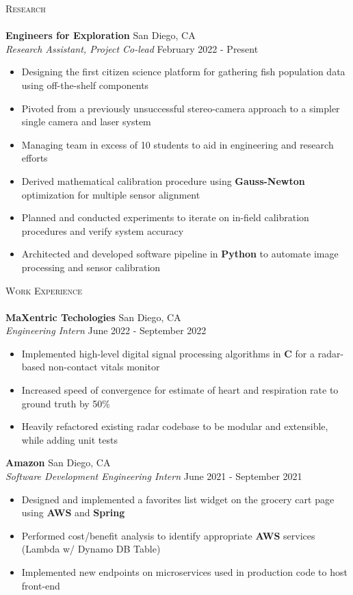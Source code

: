 \documentclass[a4paper]{article}
\newcommand{\lineunder} {
    \vspace*{-8pt} \\
    \hspace*{-18pt} \hrulefill \\
}
\newcommand{\header} [1] {
    {\hspace*{-18pt}\vspace*{6pt} \textsc{#1}}
    \vspace*{-6pt} \lineunder
}
\newenvironment{entry}[4][]{
  \textbf{#2} \hfill #1 \\
  \textit{#3} \hfill #4 \\
  \vspace{-2mm}
  \begin{itemize} \itemsep 0em
  }
  {
  \end{itemize}
}
\begin{document}
\header{Research}
\vspace{1mm}
\begin{entry}[San Diego, CA]{Engineers for Exploration}{Research
    Assistant, Project Co-lead}{February 2022 - Present}
	\item Designing the first citizen science platform for gathering fish population data
    using off-the-shelf components
    \item Pivoted from a previously unsuccessful stereo-camera approach to a simpler single camera and laser system
    \item Managing team in excess of 10 students to aid in engineering and research efforts
  \item Derived mathematical calibration procedure using \textbf{Gauss-Newton} optimization
    for multiple sensor alignment
  \item Planned and conducted experiments to iterate on in-field calibration procedures and verify system accuracy
	\item Architected and developed software pipeline in \textbf{Python} to automate image
    processing and sensor calibration
\end{entry}


\header{Work Experience}
\vspace{1mm}
\begin{entry}[San Diego, CA]{MaXentric Techologies}{Engineering Intern}{June
    2022 - September 2022}
	\item Implemented high-level digital signal processing algorithms in \textbf{C} for a radar-based non-contact vitals monitor
  \item Increased speed of convergence for estimate of heart and respiration
    rate to ground truth by 50\%
	\item Heavily refactored existing radar codebase to be modular and
    extensible, while adding unit tests
\end{entry}

  \begin{entry}[San Diego, CA]{Amazon}{Software Development Engineering
      Intern}{June 2021 - September 2021}
  \item Designed and implemented a favorites list widget on the grocery cart page using \textbf{AWS} and \textbf{Spring}
	\item Performed cost/benefit analysis to identify appropriate \textbf{AWS} services (Lambda w/ Dynamo DB Table)
	\item Implemented new endpoints on microservices used in production code to host front-end
\end{entry}
\end{document}
